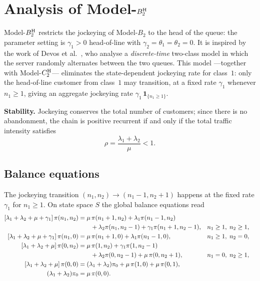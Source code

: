 \section{Analysis of Model-\texorpdfstring{$B_2^{\mathrm{H}}$}{B2-H}}
\label{sec:model_b21}

Model-$B_2^{\mathrm{H}}$ restricts the jockeying of Model-$B_2$ to the head of the queue: the parameter setting is $\gamma_1>0$ head-of-line with $\gamma_2=\theta_1=\theta_2=0$. It is inspired by the work of Devos et al.~\cite{devos2020alternating}, who analyse a \emph{discrete-time} two-class model in which the server randomly alternates between the two queues. This model ---together with Model-$C_2^{\mathrm{H}}$--- eliminates the state-dependent jockeying rate for class~$1$: only the head-of-line customer from class~$1$ may transition, at a fixed rate $\gamma_1$ whenever $n_1\geq1$, giving an aggregate jockeying rate $\gamma_1\,\mathbf{1}_{\{n_1\ge1\}}$.

\textbf{Stability.} Jockeying conserves the total number of customers; since there is no abandonment, the chain is positive recurrent if and only if the total traffic intensity satisfies
\begin{equation}
    \rho = \frac{\lambda_1+\lambda_2}{\mu} < 1.
    \label{eq:B21:stability}
\end{equation}

\subsection{Balance equations}
The jockeying transition $(n_1,n_2)\to(n_1-1,n_2+1)$ happens at the fixed rate $\gamma_1$ for $n_1\ge1$. On state space $S$ the global balance equations read
\begin{align}
    \left[\lambda_1+\lambda_2+\mu+\gamma_1\right]\pi(n_1,n_2)
    &= \mu\,\pi(n_1+1,n_2)
      +\lambda_1\pi(n_1-1,n_2) \notag\\
    &\qquad
      +\lambda_2\pi(n_1,n_2-1)
      +\gamma_1\pi(n_1+1,n_2-1),
    &&n_1\ge1,\;n_2\ge1, \label{eq:B21:interior} \\
    \left[\lambda_1+\lambda_2+\mu+\gamma_1\right]\pi(n_1,0)
    &= \mu\,\pi(n_1+1,0)
      +\lambda_1\pi(n_1-1,0),
    &&n_1\ge1,\;n_2=0, \label{eq:B21:xboundary} \\
    \left[\lambda_1+\lambda_2+\mu\right]\pi(0,n_2)
    &= \mu\,\pi(1,n_2)
      +\gamma_1\pi(1,n_2-1) \notag\\
    &\qquad
      +\lambda_2\pi(0,n_2-1)
      +\mu\,\pi(0,n_2+1),
    &&n_1=0,\;n_2\ge1, \label{eq:B21:yboundary} \\
    \left[\lambda_1+\lambda_2+\mu\right]\pi(0,0)
    &= (\lambda_1+\lambda_2)\pi_0
      + \mu\,\pi(1,0)
      + \mu\,\pi(0,1),
    &&\notag \\
    (\lambda_1+\lambda_2)\pi_0
    &= \mu\,\pi(0,0).
    &&\label{eq:B21:idle}
\end{align}


